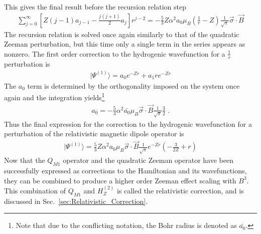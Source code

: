             \noindent This gives the final result before the recursion relation step
            \begin{align}
                \sum_{j = 0}^\infty \left[ Z(j-1)a_{j-1} - \frac{j(j+1)}{2} a_j \right] r^{j -2} = -\frac{5}{3} Z \alpha^2 a_0 \mu_B \left(\frac{1}{r} - Z \right) \frac{1}{\sqrt{\pi}}\vec{\sigma} \cdot \vec{B}
            \end{align}
            \noindent The recursion relation is solved once again similarly to that of the quadratic Zeeman perturbation, but this time only a single term in the series appears as nonzero. The first order correction to the hydrogenic wavefunction for a $\frac{1}{r}$ perturbation is 
            \begin{align}
                \vert \varPsi^{(1)} \rangle = a_0 e^{-Zr} + a_1 re^{-Zr}
            \end{align}
            \noindent The $a_0$ term is determined by the orthogonality imposed on the system once again and the integration yields\footnote{Note that due to the conflicting notation, the Bohr radius is denoted as $\bar{a_0}$.}
            \begin{align}
                a_0 = -\frac{5}{3} \alpha^2 \bar{a_0} \mu_B \vec{\sigma} \cdot \vec{B} \frac{1}{\sqrt{\pi}} \frac{3}{2}\;.
            \end{align}
            \noindent Thus the final expression for the correction to the hydrogenic wavefunction for a perturbation of the relativistic magnetic dipole operator is 
            \begin{align}
                \vert \varPsi^{(1)} \rangle = \frac{5}{3} Z \alpha^2 a_0 \mu_B \vec{\sigma} \cdot \vec{B} \frac{1}{\sqrt{\pi}} e^{-Zr} \left( - \frac{3}{2Z} + r \right)
            \end{align}
            \noindent Now that the $Q_{M1}$ operator and the quadratic Zeeman operator have been successfully expressed as corrections to the Hamiltonian and its wavefunctions, they can be combined to produce a higher order Zeeman effect scaling with $B^3$. This combination of $Q_{M1}$ and $H_Z^{(2)}$ is called the relativistic correction, and is discussed in Sec.~\ref{sec:Relativistic_Correction}.

